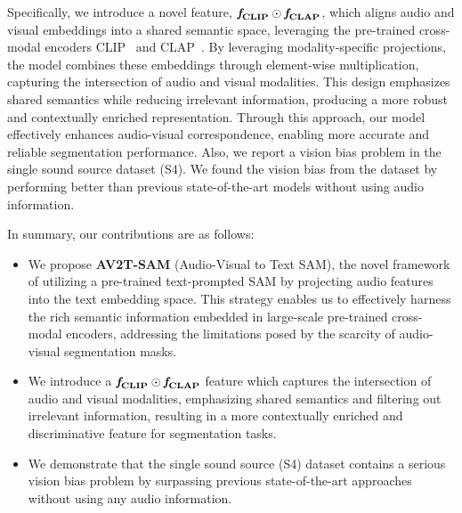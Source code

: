 Specifically, we introduce a novel feature, $\mathbf{\textit{\textbf{f}}_{CLIP} \odot \textit{\textbf{f}}_{CLAP}}$, which aligns audio and visual embeddings into a shared semantic space, leveraging the pre-trained cross-modal encoders CLIP~\cite{radford2021clip} and CLAP~\cite{elizalde2023clap}. By leveraging modality-specific projections, the model combines these embeddings through element-wise multiplication, capturing the intersection of audio and visual modalities. This design emphasizes shared semantics while reducing irrelevant information, producing a more robust and contextually enriched representation. Through this approach, our model effectively enhances audio-visual correspondence, enabling more accurate and reliable segmentation performance. Also, we report a vision bias problem in the single sound source dataset (S4). We found the vision bias from the dataset by performing better than previous state-of-the-art models without using audio information. 

In summary, our contributions are as follows: 
\begin{itemize}
    \item We propose \textbf{AV2T-SAM} (Audio-Visual to Text SAM), the novel framework of utilizing a pre-trained text-prompted SAM by projecting audio features into the text embedding space. This strategy enables us to effectively harness the rich semantic information embedded in large-scale pre-trained cross-modal encoders, addressing the limitations posed by the scarcity of audio-visual segmentation masks.
    \item We introduce a $\mathbf{\textit{\textbf{f}}_{CLIP} \odot \textit{\textbf{f}}_{CLAP}}$ feature which captures the intersection of audio and visual modalities, emphasizing shared semantics and filtering out irrelevant information, resulting in a more contextually enriched and discriminative feature for segmentation tasks.
    \item We demonstrate that the single sound source (S4) dataset contains a serious vision bias problem by surpassing previous state-of-the-art approaches without using any audio information.
\end{itemize}


